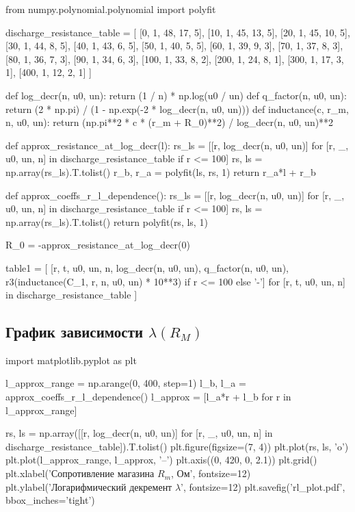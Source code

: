 \documentclass[12pt, a4paper]{article}
\begin{document}
\begin{pycode}
from numpy.polynomial.polynomial import polyfit

discharge_resistance_table = [
  [0, 1, 48, 17, 5],
  [10, 1, 45, 13, 5],
  [20, 1, 45, 10, 5],
  [30, 1, 44, 8, 5],
  [40, 1, 43, 6, 5],
  [50, 1, 40, 5, 5],
  [60, 1, 39, 9, 3],
  [70, 1, 37, 8, 3],
  [80, 1, 36, 7, 3],
  [90, 1, 34, 6, 3],
  [100, 1, 33, 8, 2],
  [200, 1, 24, 8, 1],
  [300, 1, 17, 3, 1],
  [400, 1, 12, 2, 1]
]

def log_decr(n, u0, un):
  return (1 / n) * np.log(u0 / un)
def q_factor(n, u0, un):
  return (2 * np.pi) / (1 - np.exp(-2 * log_decr(n, u0, un)))
def inductance(c, r_m, n, u0, un):
  return (np.pi**2 * c * (r_m + R_0)**2) / log_decr(n, u0, un)**2

def approx_resistance_at_log_decr(l):
  rs_ls = [[r, log_decr(n, u0, un)] for [r, _, u0, un, n] in discharge_resistance_table if r <= 100]
  rs, ls = np.array(rs_ls).T.tolist()
  r_b, r_a = polyfit(ls, rs, 1)
  return r_a*l + r_b

def approx_coeffs_r_l_dependence():
  rs_ls = [[r, log_decr(n, u0, un)] for [r, _, u0, un, n] in discharge_resistance_table if r <= 100]
  rs, ls = np.array(rs_ls).T.tolist()
  return polyfit(rs, ls, 1)

R_0 = -approx_resistance_at_log_decr(0)

table1 = [
  [r, t, u0, un, n, log_decr(n, u0, un), q_factor(n, u0, un), r3(inductance(C_1, r, n, u0, un) * 10**3) if r <= 100 else '-']
  for [r, t, u0, un, n] in discharge_resistance_table
]
\end{pycode}


\subsection*{График зависимости $\lambda(R_M)$}

\begin{pycode}
import matplotlib.pyplot as plt

l_approx_range = np.arange(0, 400, step=1)
l_b, l_a = approx_coeffs_r_l_dependence()
l_approx = [l_a*r + l_b for r in l_approx_range]

rs, ls = np.array([[r, log_decr(n, u0, un)] for [r, _, u0, un, n] in discharge_resistance_table]).T.tolist()
plt.figure(figsize=(7, 4))
plt.plot(rs, ls, 'o')
plt.plot(l_approx_range, l_approx, '--')
plt.axis((0, 420, 0, 2.1))
plt.grid()
plt.xlabel('Сопротивление магазина $R_m$, Ом', fontsize=12)
plt.ylabel('Логарифмический декремент $\lambda$', fontsize=12)
plt.savefig('rl_plot.pdf', bbox_inches='tight')
\end{pycode}
\end{document}
